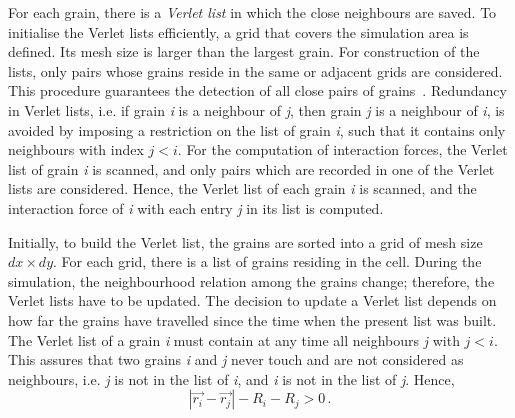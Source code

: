 For each grain, there is a \textit{Verlet list} in which the close 
neighbours are saved. To initialise the Verlet lists efficiently, a grid that 
covers the simulation area is defined. Its mesh size is larger than the largest 
grain. For construction of the lists, only pairs whose grains reside in the 
same or adjacent grids are considered. This procedure guarantees the detection 
of all close pairs of grains~\citep{Poschel2005}. Redundancy in Verlet lists, 
i.e. 
if grain \textit{i} is a neighbour of \textit{j}, then grain \textit{j} is 
a neighbour of \textit{i}, is avoided by imposing a restriction on the list of 
grain \textit{i}, such that it contains only neighbours with index 
$\mathit{j}<\mathit{i}$. For the computation of interaction forces, the Verlet 
list of grain \textit{i} is scanned, and only pairs which are recorded in one 
of the Verlet lists are considered. Hence, the Verlet list of each grain 
\textit{i} is scanned, and the interaction force of \textit{i} with each entry 
\textit{j} in its list is computed. 

Initially, to build the Verlet list, the grains are sorted into a grid of mesh 
size $\mathit{dx}\times\mathit{dy}$. For each grid, there is a list of grains 
residing in the cell. During the simulation, the neighbourhood relation among 
the grains change; therefore, the Verlet lists have to be updated. The decision 
to update a Verlet list depends on how far the grains have travelled since the 
time when the present list was built. The Verlet list of a grain \textit{i} 
must contain at any time all neighbours \textit{j} with 
$\mathit{j}<\mathit{i}$. This assures that two grains \textit{i} and 
\textit{j} never touch and are not considered as neighbours, i.e. \textit{j} is 
not in the list of \textit{i}, and \textit{i} is not in the list of \textit{j}. 
Hence,
%
\begin{equation}
\left|\overrightarrow{r_{\mathit{i}}}-\overrightarrow{r_{\mathit{j}}}\right|
-\mathit{R}_{\mathit{i}}-\mathit{R}_{\mathit{j}}>0 \,.
\end{equation}

